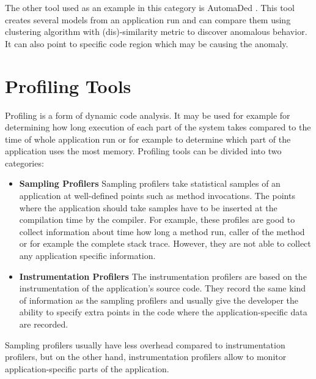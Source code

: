 The other tool used as an example in this category is AutomaDed \cite{HPC}. This tool creates several models from an application run and can compare them using clustering algorithm with (dis)-similarity metric to discover anomalous behavior. It can also point to specific code region which may be causing the anomaly.

\section{Profiling Tools}
Profiling is a form of dynamic code analysis. It may be used for example for determining how long execution of each part of the system takes compared to the time of whole application run or for example to determine which part of the application uses the most memory. Profiling tools can be divided into two categories:
\begin{itemize}
	\item \textbf{Sampling Profilers} \newline
Sampling profilers take statistical samples of an application at well-defined points such as method invocations. The points where the application should take samples have to be inserted at the compilation time by the compiler. For example, these profiles are good to collect information about time how long a method run, caller of the method or for example the complete stack trace. However, they are not able to collect any application specific information.
	\item \textbf{Instrumentation Profilers} \newline
The instrumentation profilers are based on the instrumentation of the application's source code. They record the same kind of information as the sampling profilers and usually give the developer the ability to specify extra points in the code where the application-specific data are recorded. 
\end{itemize}
 Sampling profilers usually have less overhead compared to instrumentation profilers, but on the other hand, instrumentation profilers allow to monitor application-specific parts of the application.
 
